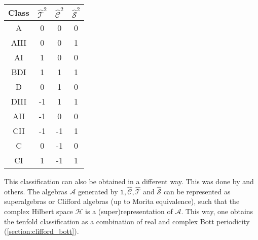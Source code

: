     \begin{table}[ht!]
        \centering
        \begin{tabular}{c|ccc}
            \hline
            Class\footnotemark&$\widehat{\mathcal{T}}^2$&$\widehat{\mathcal{C}}^2$&$\widehat{\mathcal{S}}^2$\\
            \hline
            A&0&0&0\\
            AIII&0&0&1\\
            \hline
            AI&1&0&0\\
            BDI&1&1&1\\
            D&0&1&0\\
            DIII&-1&1&1\\
            AII&-1&0&0\\
            CII&-1&-1&1\\
            C&0&-1&0\\
            CI&1&-1&1\\
            \hline
        \end{tabular}
    \end{table}

    This classification can also be obtained in a different way. This was done by  and others. The algebras $\mathcal{A}$ generated by $\mathbb{1},\widehat{\mathcal{C}},\widehat{\mathcal{T}}$ and $\widehat{\mathcal{S}}$ can be represented as superalgebras or Clifford algebras (up to Morita equivalence), such that the complex Hilbert space $\mathcal{H}$ is a (super)representation of $\mathcal{A}$. This way, one obtains the tenfold classification as a combination of real and complex Bott periodicity (\cref{section:clifford_bott}).

